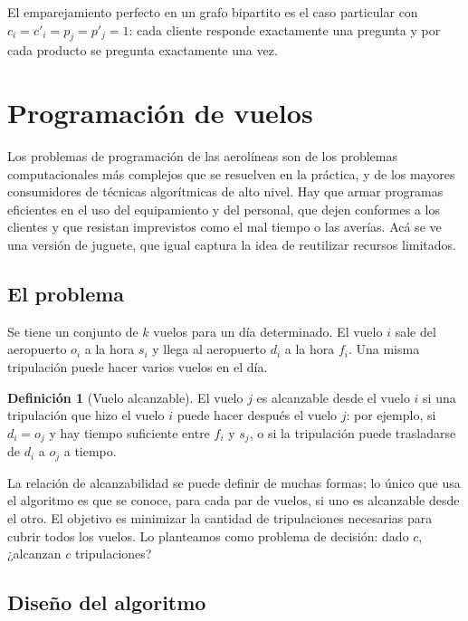 \documentclass[12pt, spanish, oneside, openany]{book}
\theoremstyle{uprightplain}
\theoremstyle{definition}
\newtheorem{definicion}[teorema]{Definición}
\theoremstyle{remark}
\theoremstyle{definition}
\begin{document}
El emparejamiento perfecto en un grafo bipartito es el caso particular con $c_i=c'_i=p_j=p'_j=1$: cada cliente responde exactamente una pregunta y por cada producto se pregunta exactamente una vez.


\section{Programación de vuelos}
\label{sec:flujo-vuelos}

Los problemas de programación de las aerolíneas son de los problemas computacionales más complejos que se resuelven en la práctica, y de los mayores consumidores de técnicas algorítmicas de alto nivel. Hay que armar programas eficientes en el uso del equipamiento y del personal, que dejen conformes a los clientes y que resistan imprevistos como el mal tiempo o las averías. Acá se ve una versión de juguete, que igual captura la idea de reutilizar recursos limitados.

\subsection{El problema}

Se tiene un conjunto de $k$ vuelos para un día determinado. El vuelo $i$ sale del aeropuerto $o_i$ a la hora $s_i$ y llega al aeropuerto $d_i$ a la hora $f_i$. Una misma tripulación puede hacer varios vuelos en el día.

\begin{definicion}[Vuelo alcanzable]
\label{def:flujo-alcanzable}
El vuelo $j$ es alcanzable desde el vuelo $i$ si una tripulación que hizo el vuelo $i$ puede hacer después el vuelo $j$: por ejemplo, si $d_i=o_j$ y hay tiempo suficiente entre $f_i$ y $s_j$, o si la tripulación puede trasladarse de $d_i$ a $o_j$ a tiempo.
\end{definicion}

La relación de alcanzabilidad se puede definir de muchas formas; lo único que usa el algoritmo es que se conoce, para cada par de vuelos, si uno es alcanzable desde el otro. El objetivo es minimizar la cantidad de tripulaciones necesarias para cubrir todos los vuelos. Lo planteamos como problema de decisión: dado $c$, ¿alcanzan $c$ tripulaciones?

\subsection{Diseño del algoritmo}
\end{document}
